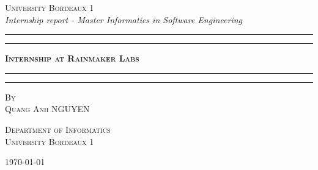 \begin{titlepage}
\begin{center}


\textsc{\Large University Bordeaux 1}\\
\vspace{10mm}
\textit{ Internship report - Master Informatics in Software Engineering}

\vspace{4mm}
\hrule height 1mm
\vspace{0.5mm}
\hrule
\vspace{1mm}
\textbf{\LARGE \textsc{Internship at Rainmaker Labs}}
\vspace{4mm}
\hrule \vspace{0.5mm}
\hrule height 1mm

\vspace{10mm}

\textsc{By}\\
\vspace{1mm}
\textsc{Quang Anh NGUYEN}\\
\vspace{10mm}

\textsc{Department of Informatics}\\
\textsc{University Bordeaux 1}




\vspace{15mm}

\mydate\today
\end{center}
\end{titlepage}